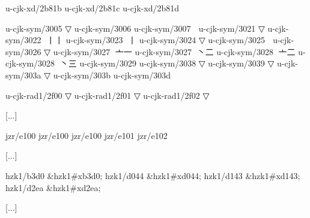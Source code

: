 \begin{multicols}{2}
[...] 
 
u-cjk-xd/2b81b	{	} 
u-cjk-xd/2b81c	{	} 
u-cjk-xd/2b81d	{	} 
 
u-cjk-sym/3005	{	}▽ 
u-cjk-sym/3006	{	} 
u-cjk-sym/3007	{\cjk{}}	{\cnxJzr{}\cjkgGlue} 
u-cjk-sym/3021	{	}▽ 
u-cjk-sym/3022	{\cjk{}}	{\cnxJzr{}\cjkgGlue}{\cjk{}丨丨} 
u-cjk-sym/3023	{\cjk{}}	{\cnxJzr{}\cjkgGlue}{丨} 
u-cjk-sym/3024	{	}▽ 
u-cjk-sym/3025	{\cjk{}}	{\cnxJzr{}\cjkgGlue} 
u-cjk-sym/3026	{	}▽ 
u-cjk-sym/3027	{\cjk{}}	{\cnxJzr{}\cjkgGlue}{\cjk{}亠一} 
u-cjk-sym/3027	{\cjk{}}	{\cnxJzr{}\cjkgGlue}{\cjk{}丶二} 
u-cjk-sym/3028	{\cjk{}}	{\cnxJzr{}\cjkgGlue}{\cjk{}亠二} 
u-cjk-sym/3028	{\cjk{}}	{\cnxJzr{}\cjkgGlue}{\cjk{}丶三} 
u-cjk-sym/3029	{	} 
u-cjk-sym/3038	{	}▽ 
u-cjk-sym/3039	{	}▽ 
u-cjk-sym/303a	{	}▽ 
u-cjk-sym/303b	{	} 
u-cjk-sym/303d	{\cjk{}}	{\cnxJzr{}\cjkgGlue} 
 
u-cjk-rad1/2f00	{	}▽ 
u-cjk-rad1/2f01	{	}▽ 
u-cjk-rad1/2f02	{	}▽ 
 
[...] 
 
jzr/e100	{	} 
jzr/e100	{	} 
jzr/e100	{	} 
jzr/e101	{	} 
jzr/e102	{	} 
 
[...] 
 
hzk1/b3d0	\&hzk1\#xb3d0;	 
hzk1/d044	\&hzk1\#xd044;	 
hzk1/d143	\&hzk1\#xd143;	 
hzk1/d2ea	\&hzk1\#xd2ea;	 
 
[...] 
\endgroup{}{}

\endgroup{}\end{multicols}
